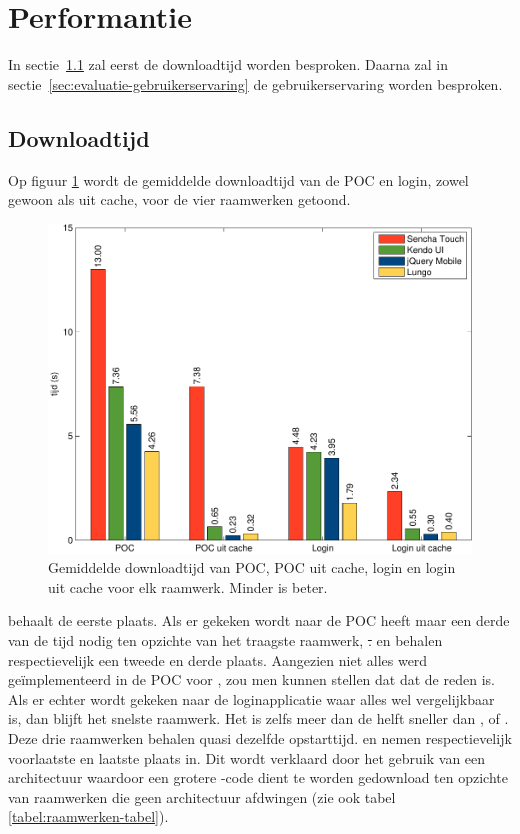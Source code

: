 \section{Performantie}
\label{sec:evaluatie-performantie}

In sectie~\ref{sec:evaluatie-downloadtijd} zal eerst de downloadtijd worden besproken.
Daarna zal in sectie~\ref{sec:evaluatie-gebruikerservaring} de gebruikerservaring worden besproken.


\subsection{Downloadtijd}
\label{sec:evaluatie-downloadtijd}

Op figuur \ref{fig:performantie} wordt de gemiddelde downloadtijd van de POC en login, zowel gewoon als uit cache, voor de vier raamwerken getoond.

\begin{figure}[H]
  \centering
  \includegraphics[width=\textwidth]{figuren/performance.pdf}
  \caption{Gemiddelde downloadtijd van POC,  POC uit cache,  login en login uit cache voor elk raamwerk. Minder is beter.}
  \label{fig:performantie}
\end{figure}

\lungo{} behaalt de eerste plaats.
Als er gekeken wordt naar de POC heeft \lungo{} maar een derde van de tijd nodig ten opzichte van het traagste raamwerk, \st.
\jqm{} en \kendo{} behalen respectievelijk een tweede en derde plaats.
Aangezien niet alles werd geïmplementeerd in de POC voor \lungo{}, zou men kunnen stellen dat dat de reden is.
Als er echter wordt gekeken naar de loginapplicatie waar alles wel vergelijkbaar is, dan blijft \lungo{} het snelste raamwerk.
Het is zelfs meer dan de helft sneller dan \jqm{}, \kendo{} of \st{}.
Deze drie raamwerken behalen quasi dezelfde opstarttijd.
\kendo{} en \st{} nemen respectievelijk voorlaatste en laatste plaats in.
Dit wordt verklaard door het gebruik van een architectuur waardoor een grotere \js{}-code dient te worden gedownload ten opzichte van raamwerken die geen architectuur afdwingen (zie ook tabel \ref{tabel:raamwerken-tabel}).

